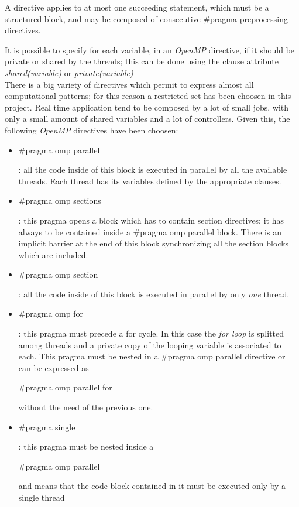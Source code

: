 \documentclass[a4paper,11pt,oneside]{book}
\begin{document}
A directive applies to at most one succeeding statement, which must be a structured block, and may be composed of consecutive $\#$pragma preprocessing directives. 

It is possible to specify for each variable, in an \emph{OpenMP} directive, if it should be private or shared by the threads; this can be done using the clause attribute \emph{shared(variable)} or \emph{private(variable)}\\
There is a big variety of  directives which permit to express almost all computational patterns; for this reason a restricted set has been choosen in this project. Real time application tend to be composed by a lot of small jobs, with only a small amount of shared variables and a lot of controllers. Given this, the following \emph{OpenMP} directives have been choosen:
\begin{itemize}
\item{\begin{bf}{$\#$pragma omp parallel}\end{bf} : all the code inside of this block is executed in parallel by all the available threads. Each thread has its variables defined by the appropriate clauses. }
\item{\begin{bf}{$\#$pragma omp sections}\end{bf} : this pragma opens a block which has to contain section directives; it has always to be contained inside a $\#$pragma omp parallel block. There is an implicit barrier at the end of this block synchronizing all the section blocks which are included. }
\item{\begin{bf}{$\#$pragma omp section}\end{bf} : all the code inside of this block is executed in parallel by only \emph{one} thread. }
\item{\begin{bf}{$\#$pragma omp for}\end{bf} : this pragma must precede a for cycle. In this case the \emph{for loop} is splitted among  threads and a private copy of the looping variable is associated to each. This pragma must be nested in a $\#$pragma omp parallel  directive or can be expressed as \begin{bf}{$\#$pragma omp parallel for}\end{bf} without the need of the previous one.  }
\item{\begin{bf}{$\#$pragma single}\end{bf} : this pragma must be nested inside a \begin{bf}{$\#$pragma omp parallel }\end{bf} and means that the code block contained in it must be executed only by a single thread}

\end{itemize}
\end{document}

